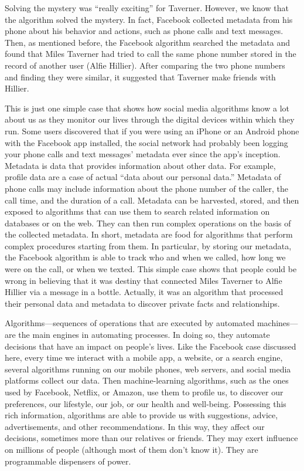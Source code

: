 Solving the mystery was ``really exciting'' for Taverner. However, we know that the algorithm solved the mystery. In fact, Facebook collected metadata from his phone about his behavior and actions, such as phone calls and text messages. Then, as mentioned before, the Facebook algorithm searched the metadata and found that Miles Taverner had tried to call the same phone number stored in the record of another user (Alfie Hillier). After comparing the two phone numbers and finding they were similar, it suggested that Taverner make friends with Hillier.

This is just one simple case that shows how social media algorithms know a lot about us as they monitor our lives through the digital devices within which they run. Some users discovered that if you were using an iPhone or an Android phone with the Facebook app installed, the social network had probably been \hbox{logging} your phone calls and text messages' metadata ever since the app's inception. Metadata is data that provides information about other data. For example, profile data are a case of actual ``data about our personal data.'' Metadata of phone calls may include information about the phone number of the caller, the call time, and the duration of a call. Metadata can be harvested, stored, and then exposed to algorithms that can use them to search related information on databases or on the web. They can then run complex operations on the basis of the collected metadata. In short, metadata are food for algorithms that perform complex procedures starting from them. In particular, by storing our metadata, the Facebook algorithm is able to track who and when we called, how long we were on the call, or when we texted. This simple case shows that people could be wrong in believing that it was destiny that connected Miles Taverner to Alfie Hillier via a message in a bottle. Actually, it was an algorithm that processed their personal data and metadata to discover private facts and relationships.

Algorithms---sequences of operations that are executed by automated machines---{\allowbreak}are the main engines in automating processes. In doing so, they automate decisions that have an impact on people's lives. Like the Facebook case discussed here, every time we interact with a mobile app, a website, or a search engine, several algorithms running on our mobile phones, web servers, and social media platforms collect our data. Then machine-learning algorithms, such as the ones used by Facebook, Netflix, or Amazon, use them to profile us, to discover our preferences, our lifestyle, our job, or our health and well-being. Possessing this rich information, algorithms are able to provide us with suggestions, advice, advertisements, and other recommendations. In this way, they affect our decisions, sometimes more than our relatives or friends. They may exert influence on millions of people (although most of them don't know it). They are programmable dispensers of power.

